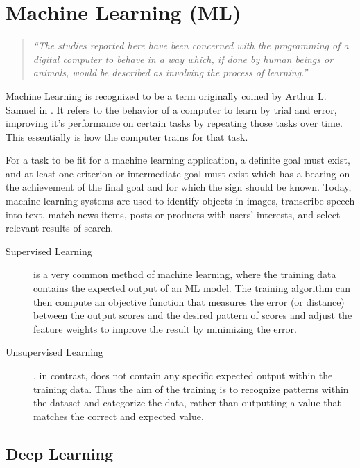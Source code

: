 \section{Machine Learning (ML)}
\begin{quotation}
	\emph{``The studies reported here have been concerned with the
			programming of a digital computer to behave in a way
			which, if done by human beings or animals, would be
			described as involving the process of learning.''}
	\citep{samuel_machinelearning}
\end{quotation} 

Machine Learning is recognized to be a term originally coined by Arthur L. Samuel in \cite{samuel_machinelearning}. It refers to the behavior of a computer to learn by trial and error, improving it's performance on certain tasks by repeating those tasks over time. This essentially is how the computer trains for that task.

For a task to be fit for a machine learning application, a definite goal must exist, and at least one criterion or intermediate goal must exist which has a bearing on the achievement of the final goal and for which the sign should be known. \citep{samuel_machinelearning} Today, machine learning systems are used to identify objects in images, transcribe speech into text, match news items, posts or products with users’ interests, and select relevant results of search. \citep{deeplearning}


\begin{description}
\item[Supervised Learning] is a very common method of machine learning, where the training data contains the expected output of an ML model. The training algorithm can then compute an objective function that measures the error (or distance) between the output scores and the desired pattern of scores \citep{deeplearning} and adjust the feature weights to improve the result by minimizing the error.

\item[Unsupervised Learning], in contrast, does not contain any specific expected output within the training data. Thus the aim of the training is to recognize patterns within the dataset and categorize the data, rather than outputting a value that matches the correct and expected value.
\end{description}

\subsection{Deep Learning}







